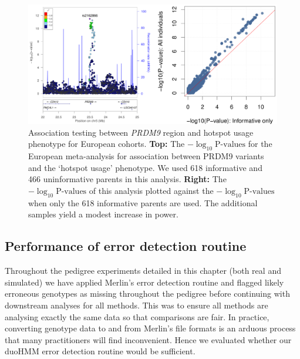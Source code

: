 \begin{figure}[h]
\vspace{10pt}
        \centering      
   \includegraphics[width=\textwidth]{chap4figs/prdm9}
  \caption[Association testing between \emph{PRDM9} region and hotspot usage phenotype] {Association testing between \emph{PRDM9} region and hotspot usage phenotype for European cohorts. \textbf{Top:} The $-\log_{10}\textrm{P-values}$ for the European meta-analysis for association between PRDM9 variants and the `hotspot usage' phenotype.  We used 618 informative and 466 uninformative parents in this analysis. \textbf{Right:} The $-\log_{10}\textrm{P-values}$ of this analysis plotted against the  $-\log_{10}\textrm{P-values}$ when only the 618 informative parents are used.  The additional samples yield a modest increase in power. \label{fig:hotspot}}
\end{figure}

\clearpage
\subsection{Performance of error detection routine}
Throughout the pedigree experiments detailed in this chapter (both real and simulated) we have applied Merlin's error detection routine and flagged likely erroneous genotypes as missing throughout the pedigree before continuing with downstream analyses for all methods. This was to ensure all methods are analysing exactly the same data so that comparisons are fair.  In practice, converting genotype data to and from Merlin's file formats  is an arduous process that many practitioners will find inconvenient.  Hence we evaluated whether our duoHMM error detection routine would be sufficient.

